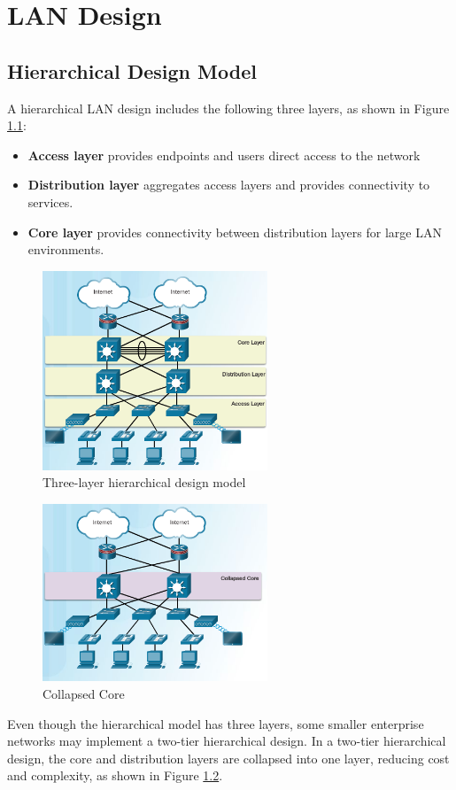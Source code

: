 \chapter{LAN Design}
\section{Hierarchical Design Model}
A hierarchical LAN design includes the following three layers, as shown in Figure \ref{Hierarchical-model}:
\begin{itemize}
\item \textbf{Access layer}  provides endpoints and users direct access to the network
\item \textbf{Distribution layer} aggregates access layers and provides connectivity to services. 
\item \textbf{Core layer} provides connectivity between distribution layers for large LAN environments.
\end{itemize}
\begin{figure}[hbtp]
\centering
\includegraphics[width=0.6\textwidth]{pictures/Hierarchical-model.png}
\caption{Three-layer hierarchical design model}
\label{Hierarchical-model}
\end{figure}
\begin{figure}[hbtp]
\centering
\includegraphics[width=0.6\textwidth]{pictures/collapsed-core.png}
\caption{Collapsed Core}
\label{collapsed-core}
\end{figure}
Even though the hierarchical model has three layers, some smaller enterprise networks may implement a two-tier hierarchical design. In a two-tier hierarchical design, the core and distribution layers are collapsed into one layer, reducing cost and complexity, as shown in Figure \ref{collapsed-core}.
